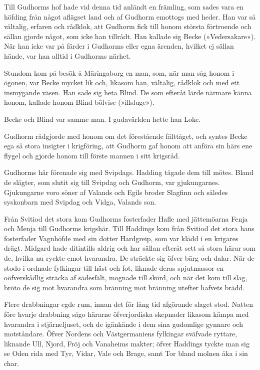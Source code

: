 Till Gudhorms hof hade vid denna tid anländt en främling, som sades vara
en höfding från något aflägset land och af Gudhorm emottogs med heder.
Han var så vältalig, erfaren och rådklok, att Gudhorm fick till honom
största förtroende och sällan gjorde något, som icke han tillrådt. Han
kallade sig Becke (»Vedersakare»). När han icke var på färder i Gudhorms
eller egna ärenden, hvilket ej sällan hände, var han alltid i Gudhorms
närhet.

Stundom kom på besök å Märingaborg en man, som, när man såg honom i
ögonen, var Becke mycket lik och, likasom han, vältalig, rådklok och med
ett insmygande väsen. Han sade sig heta Blind. De som efteråt lärde
närmare känna honom, kallade honom Blind bölvise (»illsluge»).

Becke och Blind var samme man. I gudavärlden hette han Loke.

Gudhorm rådgjorde med honom om det förestående fälttåget, och syntes
Becke ega så stora insigter i krigföring, att Gudhorm gaf honom att
anföra sin härs ene flygel och gjorde honom till förste mannen i sitt
krigsråd.

Gudhorms här förenade sig med Svipdags. Hadding tågade dem till mötes.
Bland de slägter, som slutit sig till Svipdag och Gudhorm, var
gjukungarnes. Gjukungarne voro söner af Valands och Egils broder
Slagfinn och således syskonbarn med Svipdag och Vidga, Valands son.

Från Svitiod det stora kom Gudhorms fosterfader Hafle med jättemöarna
Fenja och Menja till Gudhorms krigshär. Till Haddings kom från Svitiod
det stora hans fosterfader Vagnhöfde med sin dotter Hardgreip, som var
klädd i en
krigares drägt. Midgard hade ditintills aldrig och har sällan efteråt
sett så stora härar som de, hvilka nu ryckte emot hvarandra. De sträckte
sig öfver bärg och dalar. När de stodo i ordnade fylkingar till häst och
fot, liknade deras spjutmassor en oöfverskådlig sträcka af sädesfält,
mognade till skörd, och när det kom till slag, bröto de sig mot
hvarandra som bränning mot bränning utefter hafvets brädd.

Flere drabbningar egde rum, innan det för lång tid afgörande slaget
stod. Natten före hvarje drabbning sågo härarne öfverjordiska skepnader
likasom kämpa med hvarandra i stjärneljuset, och de igänkände i dem sina
gudomlige gynnare och motståndare. Öfver Nordens och Västgermaniens
fylkingar sväfvade ryttare, liknande Ull, Njord, Fröj och Vanaheims
makter; öfver Haddings tyckte man sig se Oden rida med Tyr, Vidar, Vale
och Brage, samt Tor bland molnen åka i sin char.

